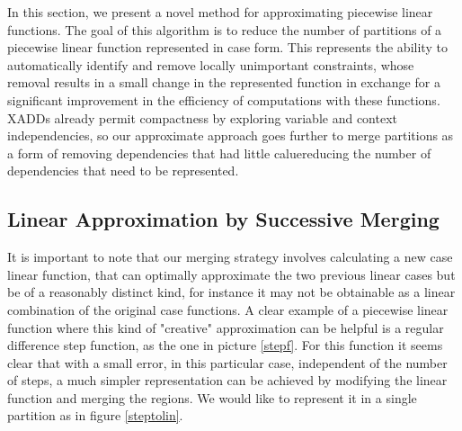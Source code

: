 In this section, we present a novel method for approximating piecewise linear functions. The goal of this algorithm is to reduce the number of partitions of a piecewise linear function represented in case form. This represents the ability to automatically identify and remove locally unimportant constraints, whose removal results in a small change in the represented function in exchange for a significant improvement in the efficiency of computations with these functions. XADDs already permit compactness by exploring variable and context independencies, so our approximate approach goes further to merge partitions as a form of removing dependencies that had little caluereducing the number of dependencies that need to be represented. 

\subsection{ Linear Approximation by Successive Merging}
It is important to note that our merging strategy involves calculating a new case linear function, that can optimally approximate the two previous linear cases but be of a reasonably distinct kind, for instance it may not be obtainable as a linear combination of the original case functions. A clear example of a piecewise linear function where this kind of  "creative" approximation can be helpful is a regular difference step function, as the one in picture \ref{stepf}. For this function it seems clear that with a small error, in this particular case, independent of the number of steps, a much simpler representation can be achieved by modifying the linear function and merging the regions. We would like to represent it in a single partition as in figure \ref{steptolin}.

